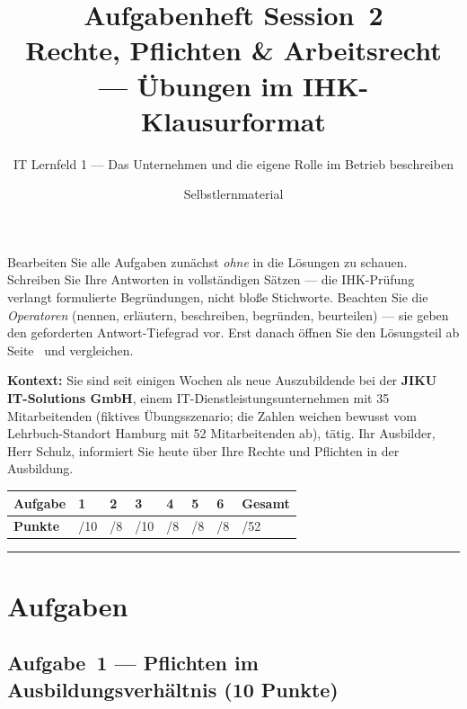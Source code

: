 \documentclass[11pt, a4paper]{article}
\title{\vspace*{-1.5cm}\Huge\bfseries\color{bfwPrimaryDark}Aufgabenheft Session~2\\[0.4em]
  \large\color{bfwInkSoft}\textnormal{Rechte, Pflichten \& Arbeitsrecht --- Übungen im IHK-Klausurformat}}
\author{\textsf{IT Lernfeld 1 --- Das Unternehmen und die eigene Rolle im Betrieb beschreiben}}
\date{Selbstlernmaterial}
\begin{document}
\maketitle
\thispagestyle{empty}

\begin{merksatz}[title={\bfseries So nutzen Sie dieses Aufgabenheft}]
Bearbeiten Sie alle Aufgaben zunächst \emph{ohne} in die Lösungen zu schauen. Schreiben
Sie Ihre Antworten in vollständigen Sätzen --- die IHK-Prüfung verlangt formulierte
Begründungen, nicht bloße Stichworte. Beachten Sie die \emph{Operatoren} (nennen,
erläutern, beschreiben, begründen, beurteilen) --- sie geben den geforderten
Antwort-Tiefegrad vor. Erst danach öffnen Sie den Lösungsteil ab Seite~\pageref{loesungen}
und vergleichen.
\end{merksatz}

\bigskip

\textbf{Kontext:} Sie sind seit einigen Wochen als neue Auszubildende bei der \textbf{JIKU IT-Solutions GmbH},
einem IT-Dienstleistungsunternehmen mit 35 Mitarbeitenden (fiktives Übungsszenario; die Zahlen
weichen bewusst vom Lehrbuch-Standort Hamburg mit 52 Mitarbeitenden ab), tätig. Ihr Ausbilder,
Herr Schulz, informiert Sie heute über Ihre Rechte und Pflichten in der Ausbildung.

\bigskip

\noindent
\begin{tabular}{|l|l|l|l|l|l|l|l|}
\hline
\textbf{Aufgabe} & 1 & 2 & 3 & 4 & 5 & 6 & \textbf{Gesamt}\\
\hline
\textbf{Punkte} & /10 & /8 & /10 & /8 & /8 & /8 & /52\\
\hline
\end{tabular}

\tableofcontents
\vspace{1em}
\hrule

\section{Aufgaben}

\subsection*{Aufgabe~1 --- Pflichten im Ausbildungsverhältnis (10 Punkte)}
\end{document}
